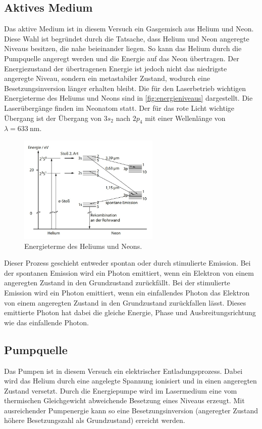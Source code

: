 \subsection{Aktives Medium}\label{sec:aktivesmedium}
Das aktive Medium ist in diesem Versuch ein Gasgemisch aus Helium und Neon. Diese Wahl ist begründet durch die Tatsache, dass Helium und Neon angeregte Niveaus besitzen, die
nahe beieinander liegen. So kann das Helium durch die Pumpquelle angeregt werden und die Energie auf das Neon übertragen. Der Energiezustand der übertragenen Energie ist jedoch
nicht das niedrigste angeregte Niveau, sondern ein metastabiler Zustand, wodurch eine Besetzungsinversion länger erhalten bleibt.
Die für den Laserbetrieb wichtigen Energieterme des Heliums und Neons sind in \autoref{fig:energieniveaus} dargestellt. Die Laserübergänge finden im Neonatom statt. Der für das rote
Licht wichtige Übergang ist der Übergang von $3s_2$ nach $2p_4$ mit einer Wellenlänge von $\lambda = \SI{633}{\nano\meter}$.\cite{eichler}
\begin{figure}[H]
    \centering
    \includegraphics[width=0.6\textwidth]{grafiken/energieniveaus.jpg}
    \caption{Energieterme des Heliums und Neons.\cite{eichler}}
    \label{fig:energieniveaus}
\end{figure}
\noindent Dieser Prozess geschieht entweder spontan oder durch stimulierte Emission. Bei der spontanen Emission wird ein Photon
emittiert, wenn ein Elektron von einem angeregten Zustand in den Grundzustand zurückfällt. Bei der stimulierte Emission wird ein Photon emittiert, wenn ein einfallendes Photon
das Elektron von einem angeregten Zustand in den Grundzustand zurückfallen lässt. Dieses emittierte Photon hat dabei die gleiche Energie, Phase und Ausbreitungsrichtung wie das
einfallende Photon.\\
\subsection{Pumpquelle}\label{sec:pumpquelle}
Das Pumpen ist in diesem Versuch ein elektrischer Entladungsprozess. Dabei wird das Helium durch eine angelegte Spannung ionisiert und in einen angeregten Zustand versetzt.
Durch die Energiepumpe wird im Lasermedium eine vom thermischen Gleichgewicht abweichende Besetzung eines Niveaus erzeugt. Mit ausreichender Pumpenergie kann so eine Besetzungsinversion (angeregter Zustand höhere Besetzungszahl als Grundzustand) erreicht werden.\\
